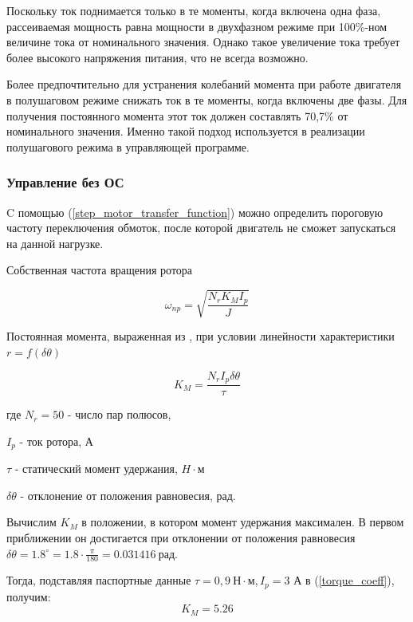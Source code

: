 Поскольку ток поднимается только в те моменты, когда включена одна фаза, рассеиваемая
мощность равна мощности в двухфазном режиме при 100\%-ном величине тока от
номинального значения. Однако такое увеличение тока требует более высокого
напряжения питания, что не всегда возможно.

Более предпочтительно для устранения колебаний момента при работе двигателя в
полушаговом режиме снижать ток в те моменты, когда включены две фазы. Для
получения постоянного момента этот ток должен составлять 70,7\% от номинального
значения. Именно такой подход используется в реализации полушагового режима
в управляющей программе.


\newpage
\subsubsection{Управление без ОС}
C помощью (\ref{step_motor_transfer_function}) можно определить пороговую
частоту переключения обмоток, после которой двигатель не сможет запускаться на данной нагрузке.

Собственная частота вращения ротора \cite[гл. 4.2, ф-ла 4.48]{Kenio}

\begin{equation}
    \label{rotor_natural_frequency}
    \omega_{np} = \sqrt{\frac{N_{r}K_{M}I_{p}}{J}}
\end{equation}

Постоянная момента, выраженная из \cite[гл. 4.2, ф-ла 4.52]{Kenio}, при условии
линейности характеристики $r = f(\delta\theta)$

\begin{equation}
    \label{torque_coeff}
    K_{M} = \frac{N_{r}I_{p}\delta\theta}{\tau}
\end{equation}

где $N_{r} = 50$ - число пар полюсов,

$I_{p}$ - ток ротора, А

$\tau$ - статический момент удержания, $H \cdot \textit{м}$

$\delta\theta$ - отклонение от положения равновесия, рад.

Вычислим $K_{M}$ в положении, в котором момент удержания максимален.
В первом приближении он достигается при отклонении от положения равновесия
$\delta\theta = 1.8^{\circ} = 1.8 \cdot \frac{\pi}{180} = 0.031416 ~\textit{рад}$.

Тогда, подставляя паспортные данные $\tau = 0,9 ~\textit{Н} \cdot \textit{м}, I_{p} = 3$ А
в (\ref{torque_coeff}), получим:
\begin{equation}
    \label{first_approximation_moment_coeff}
    K_{M} = 5.26
\end{equation}

